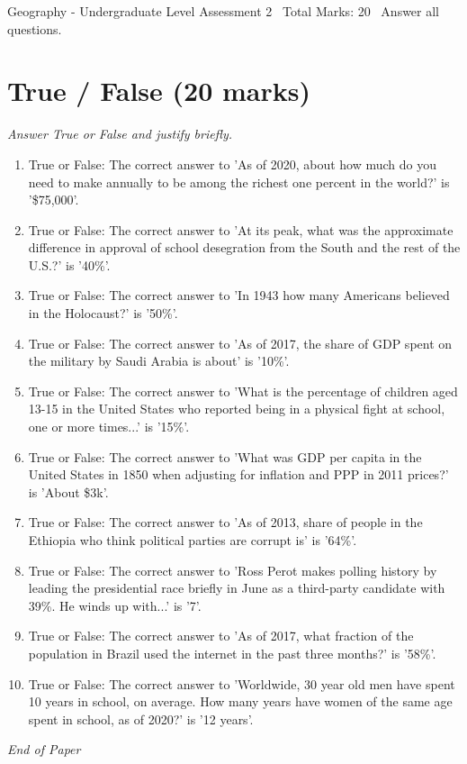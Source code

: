 \documentclass[12pt]{article}
\begin{document}
\begin{center}
Geography - Undergraduate Level Assessment 2 \
Total Marks: 20 \
Answer all questions.
\end{center}

\section*{True / False (20 marks)}
\textit{Answer True or False and justify briefly.}
\begin{enumerate}[label=\arabic*.]
\item True or False: The correct answer to 'As of 2020, about how much do you need to make annually to be among the richest one percent in the world?' is '\$75,000'.
\item True or False: The correct answer to 'At its peak, what was the approximate difference in approval of school desegration from the South and the rest of the U.S.?' is '40\%'.
\item True or False: The correct answer to 'In 1943 how many Americans believed in the Holocaust?' is '50\%'.
\item True or False: The correct answer to 'As of 2017, the share of GDP spent on the military by Saudi Arabia is about' is '10\%'.
\item True or False: The correct answer to 'What is the percentage of children aged 13-15 in the United States who reported being in a physical fight at school, one or more times...' is '15\%'.
\item True or False: The correct answer to 'What was GDP per capita in the United States in 1850 when adjusting for inflation and PPP in 2011 prices?' is 'About \$3k'.
\item True or False: The correct answer to 'As of 2013, share of people in the Ethiopia who think political parties are corrupt is' is '64\%'.
\item True or False: The correct answer to 'Ross Perot makes polling history by leading the presidential race briefly in June as a third-party candidate with 39\%. He winds up with...' is '7'.
\item True or False: The correct answer to 'As of 2017, what fraction of the population in Brazil used the internet in the past three months?' is '58\%'.
\item True or False: The correct answer to 'Worldwide, 30 year old men have spent 10 years in school, on average. How many years have women of the same age spent in school, as of 2020?' is '12 years'.
\end{enumerate}

\vfill
\noindent\textit{End of Paper}
\end{document}

